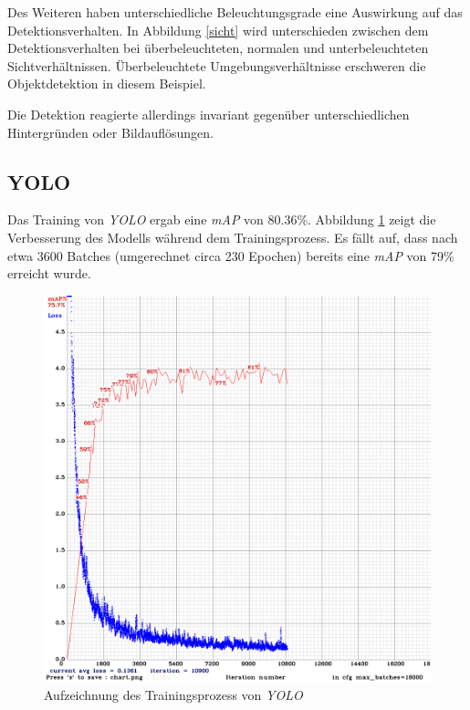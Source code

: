 Des Weiteren haben unterschiedliche Beleuchtungsgrade eine Auswirkung auf das Detektionsverhalten. In Abbildung \ref{sicht} wird unterschieden zwischen dem Detektionsverhalten bei überbeleuchteten, normalen und unterbeleuchteten Sichtverhältnissen. Überbeleuchtete Umgebungsverhältnisse erschweren die Objektdetektion in diesem Beispiel. 

Die Detektion reagierte allerdings invariant gegenüber unterschiedlichen Hintergründen oder Bildauflösungen.

\subsection*{YOLO}

Das Training von \textit{YOLO} ergab eine \textit{mAP} von 80.36\%. Abbildung \ref{yolo_result} zeigt die Verbesserung des Modells während dem Trainingsprozess. Es fällt auf, dass nach etwa 3600 Batches (umgerechnet circa 230 Epochen) bereits eine \textit{mAP} von 79\% erreicht wurde.

\begin{figure}[ht]
	\begin{center}
		\includegraphics[width=13cm]{Bilder/yolo_result.png} 
		\caption{Aufzeichnung des Trainingsprozess von \textit{YOLO}}
		\label{yolo_result}
	\end{center}
\end{figure}

